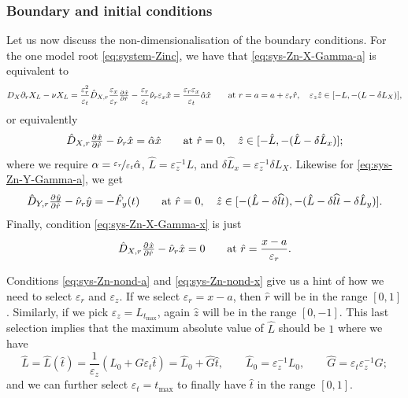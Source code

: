 \documentclass[11pt]{article}
\numberwithin{equation}{section}
\begin{document}
\subsubsection{Boundary and initial conditions}




Let us now discuss the non-dimensionalisation of the boundary conditions. For the one model root \eqref{eq:system-Zinc}, we have that \eqref{eq:sys-Zn-X-Gamma-a} is equivalent to
\[
    D_X \partial_r X_L - \nu X_L = 
    \frac{\varepsilon_r^2}{\varepsilon_t} \hat{D}_{X,r} \frac{\varepsilon_x}{\varepsilon_r} \pd{\hat{x}}{\hat{r}} - \frac{\varepsilon_r}{\varepsilon_t} \hat{\nu}_r \varepsilon_x \hat{x} = \frac{\varepsilon_r \varepsilon_x}{\varepsilon_t} \hat{\alpha} \hat{x}
    \qquad \text{at } r = a = a + \varepsilon_r \hat{r},\quad \varepsilon_z \hat{z} \in [-L, -(L - \delta L_X)],
\]
or equivalently
\begin{equation}
    \label{eq:sys-Zn-nond-a}
    \hat{D}_{X,r} \pd{\hat{x}}{\hat{r}} - \hat{\nu}_r \hat{x} = \hat{\alpha} \hat{x}
    \qquad \text{at } \hat{r} = 0, \quad \hat{z} \in [-\hat{L}, -(\hat{L} - \delta \hat{L}_x)];
\end{equation}
where we require \( \alpha = \nicefrac{\varepsilon_r}{\varepsilon_t} \hat{\alpha}\), \( \hat{L} = \varepsilon_z^{-1} L\), and \( \delta\hat{L}_x = \varepsilon_z^{-1} \delta L_X\). Likewise for \eqref{eq:sys-Zn-Y-Gamma-a}, we get %
\begin{equation}
    \label{eq:sys-Zn-nond-b}
    \hat{D}_{Y,r} \pd{\hat{y}}{\hat{r}}  - \hat{\nu}_r \hat{y} = -\hat{F}_y(t)     \qquad\text{at } \hat{r} = 0, \quad \hat{z} \in [-(\hat{L} - \delta \widehat{lt}), -(\hat{L} - \delta \widehat{lt} - \delta \hat{L}_y)].
\end{equation}
Finally, condition \eqref{eq:sys-Zn-X-Gamma-x} is just
\begin{equation}
    \label{eq:sys-Zn-nond-x}
    \hat{D}_{X,r} \pd{\hat{x}}{\hat{r}} - \hat{\nu}_r \hat{x} = 0
    \qquad \text{at } \hat{r} = \frac{x-a}{\varepsilon_r}.
\end{equation}

Conditions \eqref{eq:sys-Zn-nond-a} and \eqref{eq:sys-Zn-nond-x} give us a hint of how we need to select \(\varepsilon_r\) and \(\varepsilon_z\). If we select \( \varepsilon_r = x-a\), then \( \hat{r} \) will be in the range \( [0,1]\). Similarly, if we pick \( \varepsilon_z = L_{t_{\max}}\), again \(\hat z \) will be in the range \([0,-1]\). This last selection implies that the maximum absolute value of \( \hat{L}\) should be \(1\) where we have
\[
    \hat{L} = \hat{L}(\hat t) = \frac{1}{\varepsilon_z} ( L_0 + G \varepsilon_t \hat t )
    = \hat{L}_0 + \hat{G} \hat t,
    \qquad 
    \hat{L}_0 = \varepsilon^{-1}_z L_0,
    \qquad
    \hat{G} = \varepsilon_t \varepsilon_z^{-1} G;
\]
and we can further select \( \varepsilon_t = t_{\max}\) to finally have \( \hat t\) in the range \( [0,1]\). 
\end{document}
